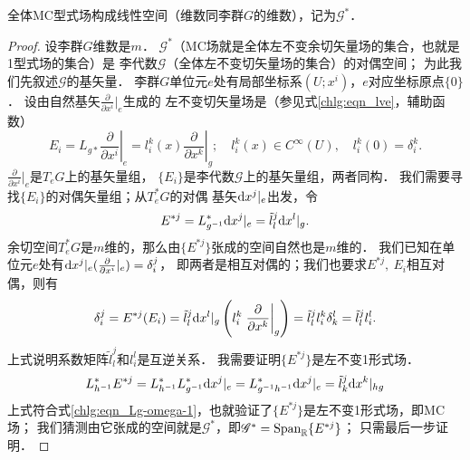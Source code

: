\begin{theorem}\label{chlg:thm_lfspace}
    全体MC型式场构成线性空间（维数同李群$G$的维数），记为$\mathscr{G}^*$．
\end{theorem}
\begin{proof}
    设李群$G$维数是$m$．
    $\mathscr{G}^*$（MC场就是全体左不变余切矢量场的集合，也就是1型式场的集合）是
    李代数$\mathscr{G}$（全体左不变切矢量场的集合）的对偶空间；
    为此我们先叙述$\mathscr{G}$的基矢量．
    李群$G$单位元$e$处有局部坐标系$(U;x^i)$，$e$对应坐标原点$\{0\}$．
    设由自然基矢$\frac{\partial }{\partial x^i}|_{e}$生成的
    左不变切矢量场是（参见式\eqref{chlg:eqn_lve}，辅助函数）
    \begin{equation}
        E_i = L_{g*} \left.\frac{\partial }{\partial x^i}\right|_{e} =
        l^k_i(x) \left.\frac{\partial }{\partial x^k}\right|_{g}; \quad
        l^k_i(x) \in C^\infty(U) , \quad l^k_i(0)=\delta^k_i .
    \end{equation}
    $\frac{\partial }{\partial x^i}|_{e}$是$T_eG$上的基矢量组，
    $\{E_i\}$是李代数$\mathscr{G}$上的基矢量组，两者同构．
    我们需要寻找$\{E_i\}$的对偶矢量组；从$T^*_eG$的对偶
    基矢${\rm d}x^j |_{e}$出发，令
    \begin{equation}
        E^{*j}= L^*_{g^{-1}} {\rm d}x^j |_{e} = \tilde{l}^j_l {\rm d}x^l |_{g}.
    \end{equation}
    余切空间$T_e^*G$是$m$维的，那么由$\{E^{*j}\}$张成的空间自然也是$m$维的．
    我们已知在单位元$e$处有${\rm d}x^j |_{e} (\frac{\partial }{\partial x^i}|_{e})=\delta^j_i$，
    即两者是相互对偶的；我们也要求$E^{*j},\ E_i$相互对偶，则有
    \begin{equation}\label{chlg:eqn_tmpinv}
        \delta^j_i = E^{*j}( E_i ) = \tilde{l}^j_l {\rm d}x^l |_{g}
        \left(l^k_i \left.\frac{\partial }{\partial x^k}\right|_{g}\right)
        =\tilde{l}^j_l l^k_i \delta^l_k 
        =\tilde{l}^j_l l^l_i .
    \end{equation}
    上式说明系数矩阵$\tilde{l}^j_l$和$ l^l_i$是互逆关系．
    我需要证明$\{E^{*j}\}$是左不变1形式场．
    \begin{equation}
        L^*_{h^{-1}}E^{*j}= L^*_{h^{-1}} L^*_{g^{-1}} {\rm d}x^j |_{e}
        = L^*_{g^{-1}h^{-1}} {\rm d}x^j |_{e}
        =\tilde{l}^j_k {\rm d}x^k |_{hg}
    \end{equation}
    上式符合式\eqref{chlg:eqn_Lg-omega-1}，也就验证了$\{E^{*j}\}$是左不变1形式场，即MC场；
    我们猜测由它张成的空间就是$\mathscr{G}^*$，即$\mathscr{G}^*={\rm Span}_{\mathbb{R}}\{E^{*j}\}$；
    只需最后一步证明．
    

\end{proof}
